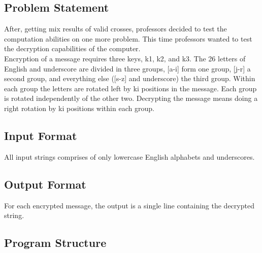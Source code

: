 \documentclass[12pt]{article}
\begin{document}
\subsection{Problem Statement}
After, getting mix results of valid crosses, professors decided to test the computation abilities on one more problem. This time professors wanted to test the decryption capabilities of the computer.\\
Encryption of a message requires three keys, k1, k2, and k3. The 26 letters of English and
underscore are divided in three groups, [a-i] form one group, [j-r] a second group, and
everything else ([s-z] and underscore) the third group. Within each group the letters are
rotated left by ki positions in the message. Each group is rotated independently of the other two. Decrypting the message means doing a right rotation by ki positions within each group.


\subsection{Input Format}
All input strings comprises of only lowercase English alphabets and underscores.

\subsection{Output Format}
For each encrypted message, the output is a single line containing the decrypted string.

\newpage
\subsection{Program Structure}
\end{document}

